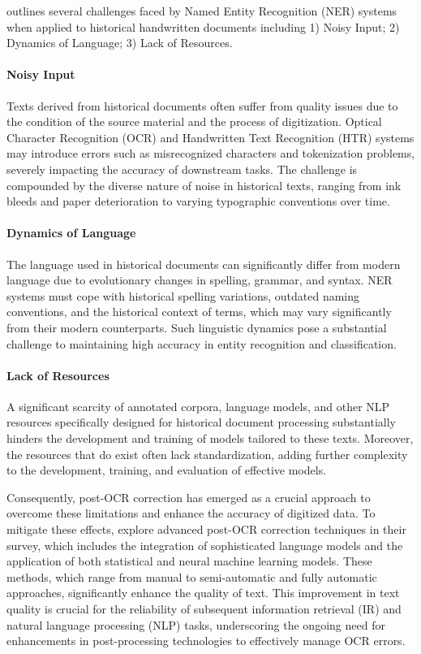 \citep{ehrmann2023named} outlines several challenges faced by Named Entity Recognition (NER) systems when applied to historical handwritten documents including 1) Noisy Input; 2) Dynamics of Language; 3) Lack of Resources. 

\paragraph*{Noisy Input}
\label{par:1_noisy_input}
Texts derived from historical documents often suffer from quality issues due to the condition of the source material and the process of digitization. Optical Character Recognition (OCR) and Handwritten Text Recognition (HTR) systems may introduce errors such as misrecognized characters and tokenization problems, severely impacting the accuracy of downstream tasks. The challenge is compounded by the diverse nature of noise in historical texts, ranging from ink bleeds and paper deterioration to varying typographic conventions over time.

\paragraph*{Dynamics of Language}
\label{par:1_dynamics_of_language}
The language used in historical documents can significantly differ from modern language due to evolutionary changes in spelling, grammar, and syntax. NER systems must cope with historical spelling variations, outdated naming conventions, and the historical context of terms, which may vary significantly from their modern counterparts. Such linguistic dynamics pose a substantial challenge to maintaining high accuracy in entity recognition and classification.

\paragraph*{Lack of Resources}
\label{par:1_lack_of_resources}
A significant scarcity of annotated corpora, language models, and other NLP resources specifically designed for historical document processing substantially hinders the development and training of models tailored to these texts. Moreover, the resources that do exist often lack standardization, adding further complexity to the development, training, and evaluation of effective models.

Consequently, post-OCR correction has emerged as a crucial approach to overcome these limitations and enhance the accuracy of digitized data. To mitigate these effects, \cite{nguyen2021survey} explore advanced post-OCR correction techniques in their survey, which includes the integration of sophisticated language models and the application of both statistical and neural machine learning models. These methods, which range from manual to semi-automatic and fully automatic approaches, significantly enhance the quality of text. This improvement in text quality is crucial for the reliability of subsequent information retrieval (IR) and natural language processing (NLP) tasks, underscoring the ongoing need for enhancements in post-processing technologies to effectively manage OCR errors.

